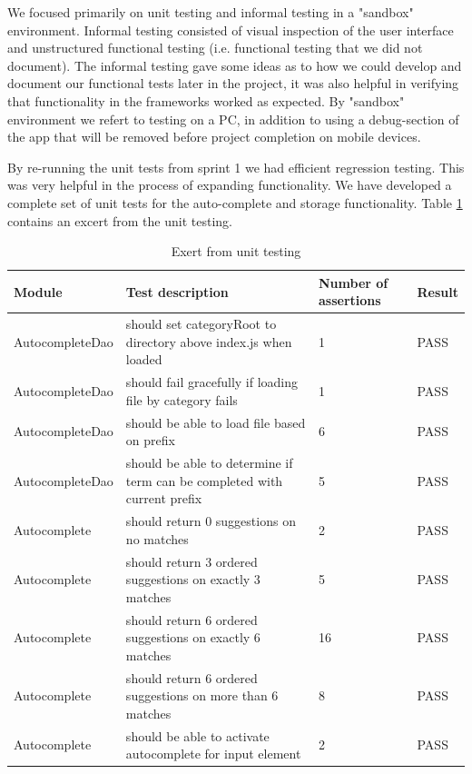 We focused primarily on unit testing and informal testing in a "sandbox"
environment. Informal testing consisted of visual inspection of the user
interface and unstructured functional testing (i.e. functional testing that we
did not document). The informal testing gave some ideas as to how we could
develop and document our functional tests later in the project, it was also
helpful in verifying that functionality in the frameworks worked as expected.
By "sandbox" environment we refert to testing on a PC, in addition to using a
debug-section of the app that will be removed before project completion on
mobile devices.

By re-running the unit tests from sprint 1 we had efficient regression testing.
This was very helpful in the process of expanding functionality. We have
developed a complete set of unit tests for the auto-complete and storage
functionality. Table \ref{sprint2:unit-testing-table} contains an excert from
the unit testing.

\begin{table}[htb]
	\label{sprint2:unit-testing-table}
	\centering
    \begin{tabular}{|l|p{5cm}|l|l|}
		\hline
		Module & Test description & Number of assertions & Result \\
		\hline \hline
		AutocompleteDao & should set categoryRoot to directory above index.js when loaded & 1 & PASS \\ \hline
		AutocompleteDao & should fail gracefully if loading file by category fails & 1 & PASS \\ \hline
		AutocompleteDao & should be able to load file based on prefix & 6 & PASS \\ \hline
		AutocompleteDao & should be able to determine if term can be completed with current prefix & 5 & PASS \\ \hline
		Autocomplete & should return 0 suggestions on no matches & 2 & PASS \\ \hline
		Autocomplete & should return 3 ordered suggestions on exactly 3 matches & 5 & PASS \\ \hline
		Autocomplete & should return 6 ordered suggestions on exactly 6 matches & 16 & PASS \\ \hline
		Autocomplete & should return 6 ordered suggestions on more than 6 matches & 8 & PASS \\ \hline
		Autocomplete & should be able to activate autocomplete for input element & 2 & PASS \\ \hline
    \end{tabular}
  \caption{Exert from unit testing}
\end{table}

